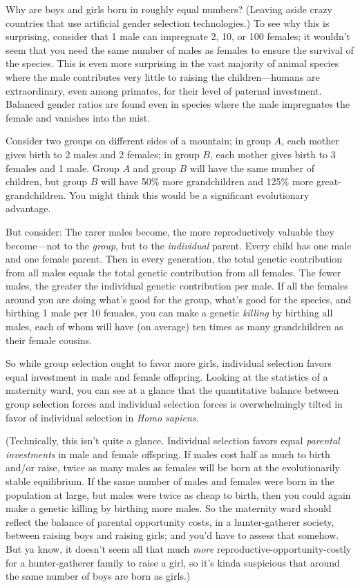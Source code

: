 {{
 Why are boys and girls born in roughly equal numbers? (Leaving
aside crazy countries that use artificial gender selection
technologies.) To see why this is surprising, consider that 1 male can
impregnate 2, 10, or 100 females; it wouldn't seem that
you need the same number of males as females to ensure the survival of
the species. This is even more surprising in the vast majority of
animal species where the male contributes very little to raising the
children---humans are extraordinary, even among primates, for their
level of paternal investment. Balanced gender ratios are found even in
species where the male impregnates the female and vanishes into the
mist.}

{
 Consider two groups on different sides of a mountain; in group $A$,
each mother gives birth to 2 males and 2 females; in group $B$, each
mother gives birth to 3 females and 1 male. Group $A$ and group $B$ will
have the same number of children, but group $B$ will have 50\% more
grandchildren and 125\% more great-grandchildren. You might think this
would be a significant evolutionary advantage.}

{
 But consider: The rarer males become, the more reproductively
valuable they become---not to the \textit{group}, but to the
\textit{individual} parent. Every child has one male and one female
parent. Then in every generation, the total genetic contribution from
all males equals the total genetic contribution from all females. The
fewer males, the greater the individual genetic contribution per male.
If all the females around you are doing what's good for
the group, what's good for the species, and birthing 1
male per 10 females, you can make a genetic \textit{killing} by
birthing all males, each of whom will have (on average) ten times as
many grandchildren as their female cousins.}

{
 So while group selection ought to favor more girls, individual
selection favors equal investment in male and female offspring. Looking
at the statistics of a maternity ward, you can see at a glance that the
quantitative balance between group selection forces and individual
selection forces is overwhelmingly tilted in favor of individual
selection in \textit{Homo sapiens.}}

{
 (Technically, this isn't quite a glance.
Individual selection favors equal \textit{parental investments} in male
and female offspring. If males cost half as much to birth and/or raise,
twice as many males as females will be born at the evolutionarily
stable equilibrium. If the same number of males and females were born
in the population at large, but males were twice as cheap to birth,
then you could again make a genetic killing by birthing more males. So
the maternity ward should reflect the balance of parental opportunity
costs, in a hunter-gatherer society, between raising boys and raising
girls; and you'd have to assess that somehow. But ya
know, it doesn't seem all that much \textit{more}
reproductive-opportunity-costly for a hunter-gatherer family to raise a
girl, so it's kinda suspicious that around the same
number of boys are born as girls.)}

}
